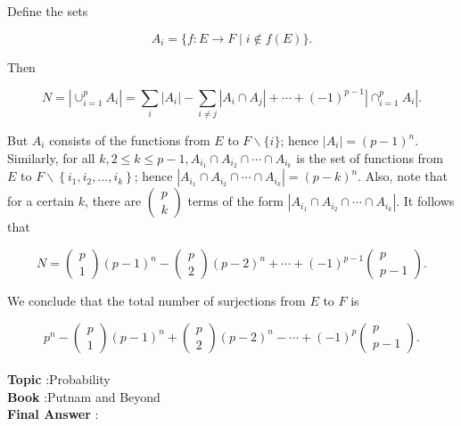\documentclass[10pt]{article}
\begin{document}
Define the sets

$$
A_{i}=\{f: E \rightarrow F \mid i \notin f(E)\} .
$$

Then

$$
N=\left|\cup_{i=1}^{p} A_{i}\right|=\sum_{i}\left|A_{i}\right|-\sum_{i \neq j}\left|A_{i} \cap A_{j}\right|+\cdots+(-1)^{p-1}\left|\cap_{i=1}^{p} A_{i}\right| .
$$

But $A_{i}$ consists of the functions from $E$ to $F \backslash\{i\}$; hence $\left|A_{i}\right|=(p-1)^{n}$. Similarly, for all $k, 2 \leq k \leq p-1, A_{i_{1}} \cap A_{i_{2}} \cap \cdots \cap A_{i_{k}}$ is the set of functions from $E$ to $F \backslash\left\{i_{1}, i_{2}, \ldots, i_{k}\right\}$; hence $\left|A_{i_{1}} \cap A_{i_{2}} \cap \cdots \cap A_{i_{k}}\right|=(p-k)^{n}$. Also, note that for a certain $k$, there are $\left(\begin{array}{l}p \\ k\end{array}\right)$ terms of the form $\left|A_{i_{1}} \cap A_{i_{2}} \cap \cdots \cap A_{i_{k}}\right|$. It follows that

$$
N=\left(\begin{array}{l}
p \\
1
\end{array}\right)(p-1)^{n}-\left(\begin{array}{l}
p \\
2
\end{array}\right)(p-2)^{n}+\cdots+(-1)^{p-1}\left(\begin{array}{c}
p \\
p-1
\end{array}\right) .
$$

We conclude that the total number of surjections from $E$ to $F$ is

$$
p^{n}-\left(\begin{array}{l}
p \\
1
\end{array}\right)(p-1)^{n}+\left(\begin{array}{l}
p \\
2
\end{array}\right)(p-2)^{n}-\cdots+(-1)^{p}\left(\begin{array}{c}
p \\
p-1
\end{array}\right) .
$$
\\
\textbf{Topic} :Probability\\
\textbf{Book} :Putnam and Beyond\\
\textbf{Final Answer} :\\
\end{document}

